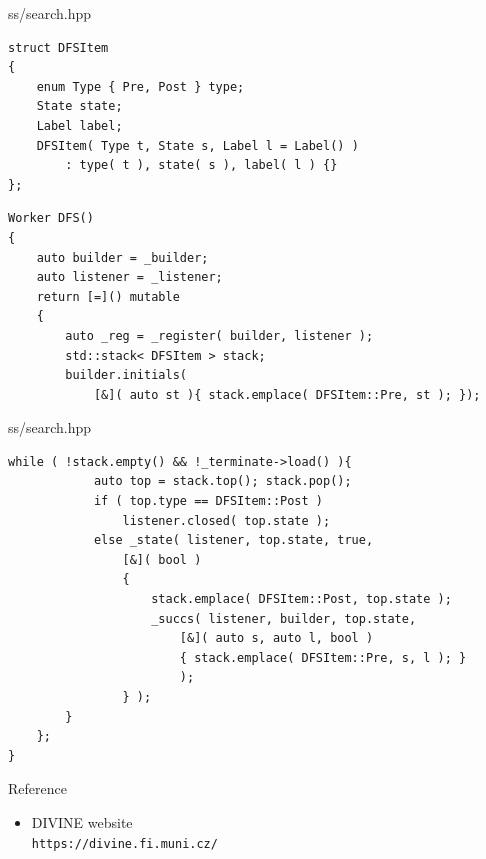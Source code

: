 \documentclass[12pt]{beamer}
\newcommand{\code}[1]{\texttt{#1}}
\begin{document}
\begin{frame}[fragile]{ss/search.hpp}
\begin{lstlisting}[basicstyle=\footnotesize\ttfamily]
struct DFSItem
{
    enum Type { Pre, Post } type;
    State state;
    Label label;
    DFSItem( Type t, State s, Label l = Label() )
        : type( t ), state( s ), label( l ) {}
};
\end{lstlisting}
\begin{lstlisting}[basicstyle=\footnotesize\ttfamily]
Worker DFS()
{
    auto builder = _builder;
    auto listener = _listener;
    return [=]() mutable
    {
        auto _reg = _register( builder, listener );
        std::stack< DFSItem > stack;
        builder.initials( 
            [&]( auto st ){ stack.emplace( DFSItem::Pre, st ); });
\end{lstlisting}
\end{frame}

\begin{frame}[fragile]{ss/search.hpp}
\begin{lstlisting}[basicstyle=\footnotesize\ttfamily]
        while ( !stack.empty() && !_terminate->load() ){
            auto top = stack.top(); stack.pop();
            if ( top.type == DFSItem::Post )
                listener.closed( top.state );
            else _state( listener, top.state, true,
                [&]( bool )
                {
                    stack.emplace( DFSItem::Post, top.state );
                    _succs( listener, builder, top.state,
                        [&]( auto s, auto l, bool )
                        { stack.emplace( DFSItem::Pre, s, l ); }
                        );
                } );
        }
    };
}
\end{lstlisting}
\end{frame}

\begin{frame}{Reference}
\begin{itemize}
    \item DIVINE website\\
        \code{https://divine.fi.muni.cz/}
\end{itemize}
\end{frame}
\end{document}
